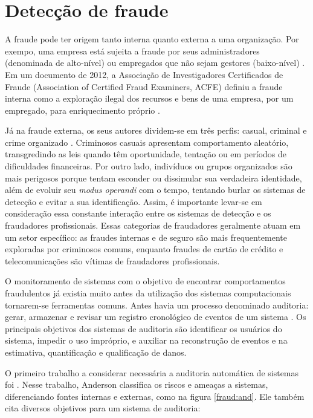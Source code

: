 \chapter{Detecção de fraude}

A fraude pode ter origem tanto interna quanto externa a uma organização. Por exempo, uma empresa está sujeita a fraude por seus administradores (denominada de alto-nível) ou empregados que não sejam gestores (baixo-nível) \cite{Phua2010}. Em um documento de 2012, a Associação de Investigadores Certificados de Fraude (Association of Certified Fraud Examiners, ACFE) definiu a fraude interna como a exploração ilegal dos recursos e bens de uma empresa, por um empregado, para enriquecimento próprio \cite{ACFE2012}.

Já na fraude externa, os seus autores dividem-se em três perfis: casual, criminal e crime organizado \cite{Phua2010}. Criminosos casuais apresentam comportamento aleatório, transgredindo as leis quando têm oportunidade, tentação ou em períodos de dificuldades financeiras. Por outro lado, indivíduos ou grupos organizados são mais perigosos porque tentam esconder ou dissimular sua verdadeira identidade, além de evoluir seu \emph{modus operandi} com o tempo, tentando burlar os sistemas de detecção e evitar a sua identificação. Assim, é importante levar-se em consideração essa constante interação entre os sistemas de detecção e os fraudadores profissionais. Essas categorias de fraudadores geralmente atuam em um setor específico: as fraudes internas e de seguro são mais frequentemente exploradas por criminosos comuns, enquanto fraudes de cartão de crédito e telecomunicações são vítimas de fraudadores profissionais.

O monitoramento de sistemas com o objetivo de encontrar comportamentos fraudulentos já existia muito antes da utilização dos sistemas computacionais tornarem-se ferramentas comuns. Antes havia um processo denominado auditoria: gerar, armazenar e revisar um registro cronológico de eventos de um sistema \cite{Bace2000}. Os principais objetivos dos sistemas de auditoria são identificar os usuários do sistema, impedir o uso impróprio, e auxiliar na reconstrução de eventos e na estimativa, quantificação e qualificação de danos.

O primeiro trabalho a considerar necessária a auditoria automática de sistemas foi \citet{Anderson1972}. Nesse trabalho, Anderson classifica os riscos e ameaças a sistemas, diferenciando fontes internas e externas, como na figura \ref{fraud:and}. Ele também cita diversos objetivos para um sistema de auditoria:

